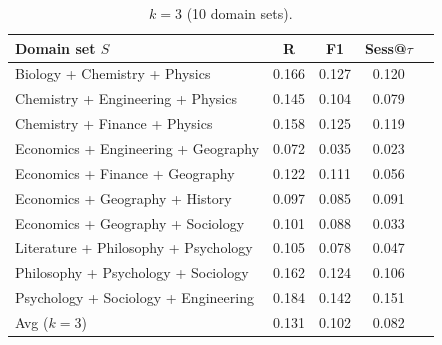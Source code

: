 \begin{table}[!ht]
\centering
\small
\setlength{\tabcolsep}{3.6pt}
\renewcommand{\arraystretch}{1.08}
\ContinuedFloat

\begin{subtable}[t]{\textwidth}
\caption{$k{=}3$ (10 domain sets).}
\centering
\begin{tabular}{lcccc}
\toprule
Domain set $S$ &
R &
F1 &
Sess@$\tau$ \\
\midrule
Biology + Chemistry + Physics                      & 0.166 & 0.127 & 0.120 \\
Chemistry + Engineering + Physics                  & 0.145 & 0.104 & 0.079 \\
Chemistry + Finance + Physics                      & 0.158 & 0.125 & 0.119 \\
Economics + Engineering + Geography                & 0.072 & 0.035 & 0.023 \\
Economics + Finance + Geography                    & 0.122 & 0.111 & 0.056 \\
Economics + Geography + History                    & 0.097 & 0.085 & 0.091 \\
Economics + Geography + Sociology                  & 0.101 & 0.088 & 0.033 \\
Literature + Philosophy + Psychology               & 0.105 & 0.078 & 0.047 \\
Philosophy + Psychology + Sociology                & 0.162 & 0.124 & 0.106 \\
Psychology + Sociology + Engineering               & 0.184 & 0.142 & 0.151 \\
\midrule
Avg ($k{=}3$)                                      & 0.131 & 0.102 & 0.082 \\
\bottomrule
\end{tabular}
\end{subtable}


\end{table}
